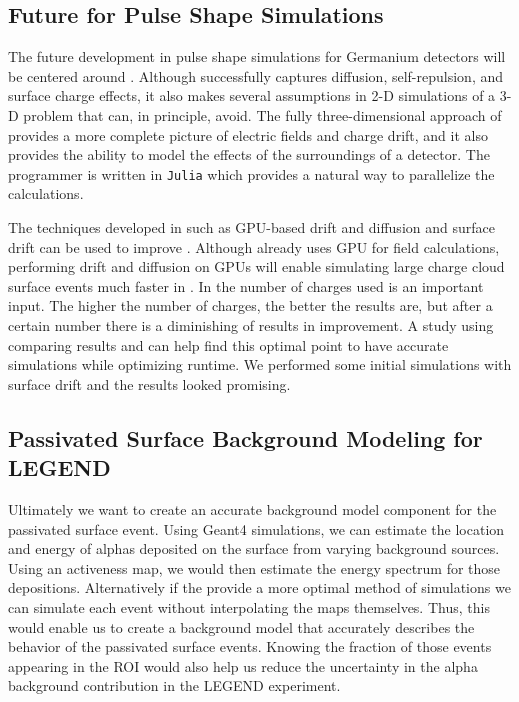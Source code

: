 \subsection{Future for Pulse Shape Simulations}

The future development in pulse shape simulations for Germanium detectors will be centered around {\ssd} . Although {\ehd} successfully captures diffusion, self-repulsion, and surface charge effects, it also makes several assumptions in 2-D simulations of a 3-D problem that {\ssd} can, in principle, avoid. The fully three-dimensional approach of {\ssd} provides a more complete picture of electric fields and charge drift, and it also provides the ability to model the effects of the surroundings of a detector. The programmer is written in \texttt{Julia} which provides a natural way to parallelize the calculations.

The techniques developed in {\ehd} such as GPU-based drift and diffusion and surface drift can be used to improve {\ssd}. Although {\ssd} already uses GPU for field calculations, performing drift and diffusion on GPUs will enable simulating large charge cloud surface events much faster in {\ssd}. In {\ssd} the number of charges used is an important input. The higher the number of charges, the better the results are, but after a certain number there is a diminishing of results in improvement. A study using comparing {\ehd} results and {\ssd} can help find this optimal point to have accurate simulations while optimizing runtime. We performed some initial {\ssd} simulations with surface drift and the results looked promising.

\subsection{Passivated Surface Background Modeling for LEGEND}
Ultimately we want to create an accurate background model component for the passivated surface event. Using Geant4 simulations, we can estimate the location and energy of alphas deposited on the surface from varying background sources. Using an activeness map, we would then estimate the energy spectrum for those depositions. Alternatively if the {\ssd} provide a more optimal method of simulations we can simulate each event without interpolating the maps themselves. Thus, this would enable us to create a background model that accurately describes the behavior of the passivated surface events. Knowing the fraction of those events appearing in the {\onbb} ROI would also help us reduce the uncertainty in the alpha background contribution in the LEGEND experiment.

